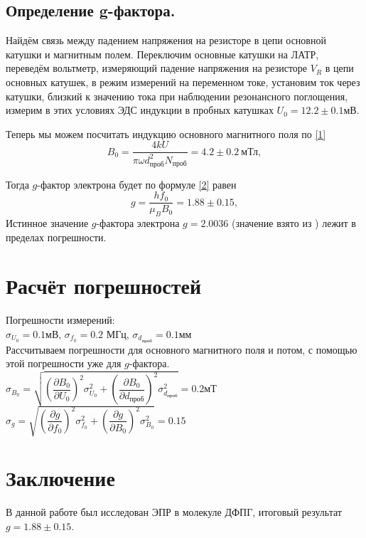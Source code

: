 \documentclass[a4paper,12pt]{article}
\begin{document}
\subsection*{Определение g-фактора.}
    Найдём связь между падением напряжения на резисторе в цепи основной катушки и магнитным полем. 
    Переключим основные катушки на ЛАТР, переведём вольтметр, измеряющий
    падение напряжения на резисторе $V_R$ в цепи основных катушек, в режим измерений на
    переменном токе, установим ток через катушки, близкий к значению тока при наблюдении резонансного поглощения, измерим в этих условиях ЭДС индукции в пробных катушках $U_0 = 12.2 \pm 0.1$мВ. 
    
    Теперь мы можем посчитать индукцию основного магнитного поля по \eqref{1}
    \[B_0 = \dfrac{4k U}{\pi \omega d_{\text{проб}}^2 N_{\text{проб}}} = 4.2 \pm 0.2~\text{мТл},\]
    
    Тогда $g$-фактор электрона будет по формуле \eqref{2} равен
    \[g = \dfrac{hf_0}{\mu_B B_0} = 1.88 \pm 0.15,\]
    Истинное значение $g$-фактора электрона $g = 2.0036$ (значение взято из \cite{laba1}) лежит в пределах погрешности.

\section*{Расчёт погрешностей}

    Погрешности измерений:\\
        $\sigma_{U_0} = 0.1$мВ, $\sigma_{f_0} = 0.2$ МГц, $\sigma_{d_\text{проб}} = 0.1$мм\\
    
    Рассчитываем погрешности для основного магнитного поля и потом, с помощью этой погрешности уже для $g$-фактора.\\
        $ \sigma_{B_0} = \sqrt{ \left( \dfrac{\partial B_0}{\partial U_0}\right)^2 \sigma_{U_0}^2 + \left( \dfrac{\partial B_0}{\partial d_{\text{проб}}}\right)^2 \sigma_{d_{\text{проб}}}^2} = 0.2$мТ\\
        $ \sigma_g = \sqrt{ \left( \dfrac{\partial g}{\partial f_0}\right)^2 \sigma_{f_0}^2 + \left( \dfrac{\partial g}{\partial B_0}\right)^2 \sigma_{B_0}^2} = 0.15$\\

\section*{Заключение}
    В данной работе был исследован ЭПР в молекуле ДФПГ, итоговый результат $g = 1.88 \pm 0.15$.
    
\end{document}
